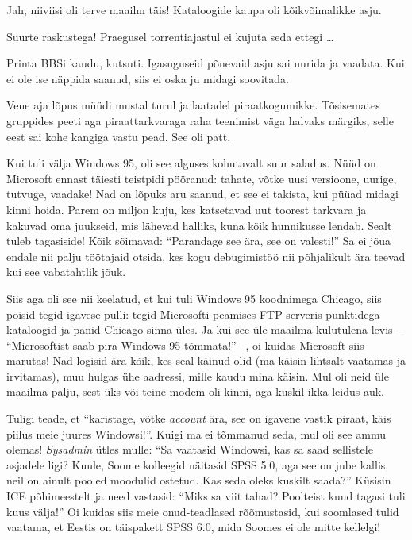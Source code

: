 
Jah, niiviisi oli terve maailm täis! Kataloogide kaupa oli kõikvõimalikke asju.


Suurte raskustega! Praegusel torrentiajastul ei kujuta seda ettegi \ldots


Printa BBSi kaudu, kutsuti. Igasuguseid põnevaid asju sai uurida ja vaadata. Kui ei ole ise näppida saanud, siis ei oska ju midagi soovitada.

Vene aja lõpus müüdi mustal turul ja laatadel piraatkogumikke. Tõsisemates gruppides peeti aga
piraattarkvaraga raha teenimist 
väga halvaks märgiks, selle eest sai kohe kangiga vastu 
pead. See oli patt. 

Kui tuli välja Windows 95, oli see alguses kohutavalt suur saladus. Nüüd on 
Microsoft ennast täiesti teistpidi pööranud: tahate, võtke uusi versioone, 
uurige, tutvuge, vaadake! Nad on lõpuks aru saanud, et see ei takista, kui püüad midagi 
kinni hoida. Parem on miljon kuju, kes katsetavad uut 
toorest tarkvara ja kakuvad oma juukseid, mis lähevad 
halliks, kuna kõik hunnikusse lendab. Sealt tuleb tagasiside! Kõik sõimavad: 
\enquote{Parandage see ära, see on valesti!} Sa ei jõua endale nii palju 
töötajaid otsida, kes kogu debugimistöö nii põhjalikult ära teevad 
kui see vabatahtlik jõuk. 

Siis aga oli see nii keelatud, et kui tuli 
Windows 95 koodnimega Chicago, siis 
poisid tegid igavese pulli: tegid Microsofti peamises FTP-serveris 
punktidega kataloogid ja panid Chicago sinna üles. Ja 
kui see üle maailma kulutulena levis -- \enquote{Microsoftist saab pira-Windows 
95 tõmmata!} --, oi kuidas Microsoft siis marutas! Nad logisid ära kõik, kes seal käinud 
olid (ma käisin lihtsalt vaatamas ja irvitamas), muu hulgas ühe aadressi, mille kaudu 
mina käisin. Mul oli neid üle maailma palju, sest üks või teine modem oli kinni, aga
kuskil ikka leidus auk. 

Tuligi teade, et \enquote{karistage, võtke 
\emph{account} ära, see on igavene vastik piraat, käis piilus meie juures 
Windowsi!}. Kuigi ma ei tõmmanud seda, mul oli see ammu olemas! \emph{Sysadmin} ütles mulle:
\enquote{Sa vaatasid Windowsi, kas sa saad sellistele asjadele ligi? Kuule, Soome kolleegid näitasid SPSS 5.0, aga see on jube kallis, neil 
on ainult pooled moodulid ostetud. Kas seda oleks kuskilt saada?} Küsisin ICE 
põhimeestelt ja need vastasid: \enquote{Miks sa viit tahad? 
Poolteist kuud tagasi tuli kuus välja!} Oi kuidas siis meie onud-teadlased 
rõõmustasid, kui soomlased tulid vaatama, et Eestis on täispakett SPSS 
6.0, mida Soomes ei ole mitte kellelgi! 

